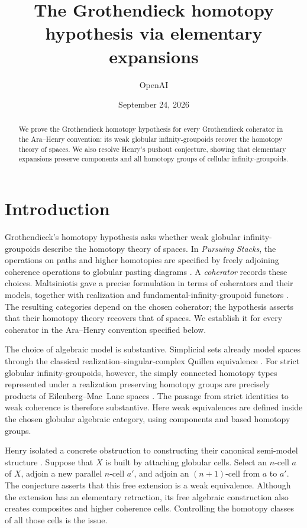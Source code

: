 \documentclass[11pt,letterpaper]{article}
\title{The Grothendieck homotopy hypothesis via elementary expansions}
\author{OpenAI}
\date{September 24, 2026}
\numberwithin{equation}{section}
\theoremstyle{plain}
\theoremstyle{definition}
\theoremstyle{remark}
\begin{document}
\maketitle
\begin{abstract}
We prove the Grothendieck homotopy hypothesis for every Grothendieck
coherator in the Ara--Henry convention: its weak globular infinity-groupoids
recover the homotopy theory of spaces.
We also resolve Henry's pushout conjecture, showing that elementary expansions
preserve components and all homotopy groups of cellular infinity-groupoids.
\end{abstract}
\section{Introduction}\label{sec:introduction}

Grothendieck's homotopy hypothesis asks whether weak globular
infinity-groupoids describe the homotopy theory of spaces.  In
\emph{Pursuing Stacks}, the operations on paths and higher homotopies
are specified by freely adjoining coherence operations to globular
pasting diagrams \cite[Sections~9 and~12--13]{Grothendieck1983}.
A \emph{coherator} records these choices.  Maltsiniotis gave a precise
formulation in terms of coherators and their models, together with
realization and fundamental-infinity-groupoid functors
\cite{Maltsiniotis2007,Maltsiniotis2010}.
The resulting categories depend on the chosen coherator; the hypothesis
asserts that their homotopy theory recovers that of spaces.
We establish it for every coherator in the Ara--Henry convention
specified below.

The choice of algebraic model is substantive.  Simplicial sets already
model spaces through the classical realization--singular-complex
Quillen equivalence \cite[Theorem~3.6.7]{Hovey1999}.
For strict globular infinity-groupoids, however, the simply connected
homotopy types represented under a realization preserving homotopy
groups are precisely products of Eilenberg--Mac~Lane spaces \cite[Theorem~5.4]{AraStrict2013}.
The passage from strict identities to weak coherence is therefore
substantive.  Here weak equivalences are defined
inside the chosen globular algebraic category, using components and
based homotopy groups.

Henry isolated a concrete obstruction to constructing their canonical
semi-model structure \cite[Conjecture~5.3.3]{Henry2016}.  Suppose that \(X\)
is built by attaching globular cells.  Select an \(n\)-cell \(a\) of \(X\),
adjoin a new parallel \(n\)-cell \(a'\), and adjoin an \((n+1)\)-cell from
\(a\) to \(a'\).  The conjecture asserts that this free extension is a weak
equivalence.  Although the extension has an elementary retraction, its
free algebraic construction also creates composites and higher coherence
cells.  Controlling the homotopy classes of all those cells is the issue.
\end{document}
